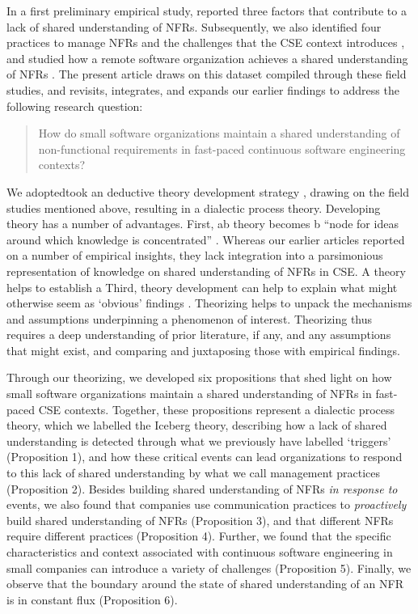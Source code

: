 \documentclass[smallextended]{svjour3}
\begin{document}
\textcopyright

In a first preliminary empirical study, \cite{werner2020re} reported three factors that contribute to a lack of shared understanding of NFRs. 
Subsequently, we also identified four practices to manage NFRs and the challenges that the CSE context introduces \citep{werner_tse_2021}, and studied how a remote software organization achieves a shared understanding of NFRs \citep{okpara_re2022,okpara_rej2023}. 
The present article draws on this dataset compiled through these field studies, and revisits, integrates, and expands our earlier findings to address the following research question:

\begin{quote}
\normalsize  
    How do small software organizations maintain a shared understanding of non-functional requirements in fast-paced continuous software engineering contexts?
\end{quote}

We adoptedtook an deductive theory development strategy \citep{stol2018abc}, drawing on the field studies mentioned above, resulting in a dialectic process theory. 
Developing theory has a number of advantages. First, ab theory becomes b ``node for ideas around which knowledge is concentrated'' \cite[p. xi]{miner2015organizational}. Whereas our earlier articles reported on a number of empirical insights, they lack integration into a parsimonious representation of knowledge on shared understanding of NFRs in CSE. A theory helps to establish a
Third, theory development can help to explain what might otherwise seem as `obvious' findings \citep{stol2024theorizing}. Theorizing helps to unpack the mechanisms and assumptions underpinning a phenomenon of interest. Theorizing thus requires a deep understanding of prior literature, if any, and any assumptions that might exist, and comparing and juxtaposing those with empirical findings. 

Through our theorizing, we developed six propositions that shed light on how small software organizations maintain a shared understanding of NFRs in fast-paced CSE contexts. 
Together, these propositions represent a dialectic process theory, which we labelled the Iceberg theory, describing how a lack of shared understanding is detected through what we previously have labelled `triggers' \citep{werner2020re} (Proposition 1), and how these critical events can lead organizations to respond to this lack of shared understanding by what we call management practices (Proposition 2). Besides building shared understanding of NFRs \textit{in response to} events, we also found that companies use communication practices to \textit{proactively} build shared understanding of NFRs (Proposition 3), and that different NFRs require different practices (Proposition 4). Further, we found that the specific characteristics and context associated with continuous software engineering in small companies can introduce a variety of challenges (Proposition 5). Finally, we observe that the boundary around the state of shared understanding of an NFR is in constant flux (Proposition 6).
\end{document}
